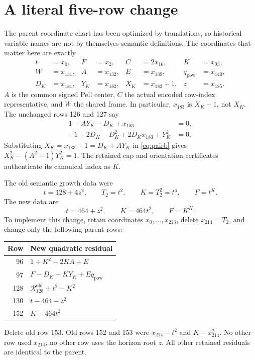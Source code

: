 \documentclass[11pt,a4paper]{article}
\theoremstyle{definition}
\newcommand{\R}{\mathcal R}
\begin{document}
\section{A literal five-row change}

The parent coordinate chart has been optimized by translations, so
historical variable names are not by themselves semantic definitions.
The coordinates that matter here are exactly
\begin{align*}
 t&=x_0, & F&=x_2, & C&=2x_{16}, & K&=x_{93},\\
 W&=x_{131}, & A&=x_{132}, & E&=x_{139}, & q_{\mathrm{pow}}&=x_{140},\\
 D_K&=x_{181}, & Y_K&=x_{182}, & X_K&=x_{183}+1, & z&=x_{185}.
\end{align*}
$A$ is the common signed Pell center, $C$ the actual encoded row-index
representative, and $W$ the shared frame. In particular, $x_{183}$ is
$X_K-1$, not $X_K$. The unchanged rows 126 and 127 say
\begin{align}
 1-AY_K-D_K+x_{183}&=0,\label{eq:paira}\\
 -1+2D_K-D_K^2+2D_Kx_{183}+Y_K^2&=0.\label{eq:pairb}
\end{align}
Substituting $X_K=x_{183}+1=D_K+AY_K$ in \eqref{eq:pairb} gives
$X_K^2-(A^2-1)Y_K^2=1$. The retained cap and orientation certificates
authenticate its canonical index as $K$.

The old semantic growth data were
\[
 t=128+4z^2,\qquad T_2=t^2,\qquad K=T_2^2=t^4,\qquad F=t^K.
\]
The new data are
\begin{equation}\label{eq:newgrowth}
 \boxed{t=464+z^2,\qquad K=464t^2,\qquad F=K^K.}
\end{equation}
To implement this change, retain coordinates $x_0,\ldots,x_{213}$,
delete $x_{214}=T_2$, and change only the following parent rows:
\begin{center}
\begin{tabular}{rl}
\toprule
Row & New quadratic residual\\
\midrule
96 & $1+K^2-2KA+E$\\
97 & $F-D_K-KY_K+E q_{\mathrm{pow}}$\\
128 & $\R^{\mathrm{old}}_{128}+t^2-K^2$\\
130 & $t-464-z^2$\\
152 & $K-464t^2$\\
\bottomrule
\end{tabular}
\end{center}
Delete old row 153. Old rows 152 and 153 were $x_{214}-t^2$ and
$K-x_{214}^2$. No other row used $x_{214}$; no other row uses the horizon
root $z$. All other retained residuals are identical to the parent.
\end{document}
